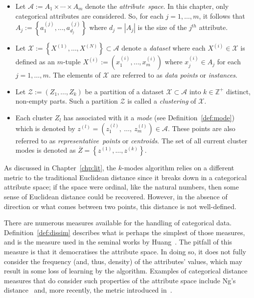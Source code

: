 \begin{itemize}
    \item Let \(\mathcal{A} := A_1 \times \cdots \times A_m\) denote the
        \emph{attribute~space}. In this chapter, only categorical attributes are
        considered. So, for each \(j = 1, \ldots, m\), it follows that
        \(A_j := \left\{a_1^{(j)}, \ldots, a_{d_j}^{(j)}\right\}\) where
        \(d_j=|A_j|\) is the size of the \(j^{th}\) attribute.

    \item Let \(\mathcal{X} := \left\{X^{(1)}, \ldots, X^{(N)}\right\} \subset
        \mathcal{A}\) denote a \emph{dataset} where each \(X^{(i)} \in
        \mathcal{X}\) is defined as an \(m\)-tuple \(X^{(i)} := \left(x_1^{(i)},
        \ldots, x_m^{(i)}\right)\) where \(x_j^{(i)} \in A_j\) for each \(j = 1,
        \ldots, m\). The elements of \(\mathcal{X}\) are referred to as
        \emph{data points} or \emph{instances}.
    \item Let \(\mathcal{Z} := \left(Z_1, \ldots, Z_k\right)\) be a partition
        of a dataset \(\mathcal{X} \subset \mathcal A\) into \(k \in
        \mathbb{Z}^{+}\) distinct, non-empty parts. Such a partition
        \(\mathcal{Z}\) is called a \emph{clustering} of \(\mathcal{X}\).

    \item Each cluster \(Z_l\) has associated with it a
        \emph{mode} (see Definition~\ref{def:mode}) which is
        denoted by \(z^{(l)} = \left(z_1^{(l)},~\ldots,~z_m^{(l)}\right) \in
        \mathcal{A}\). These points are also referred to as
        \emph{representative~points} or \emph{centroids}. The set of all current
        cluster modes is denoted as \(\overline Z = \left\{z^{(1)}, \ldots,
        z^{(k)}\right\}\).
\end{itemize}

As discussed in Chapter~\ref{chp:lit}, the \(k\)-modes algorithm relies on a
different metric to the traditional Euclidean distance since it breaks down in a
categorical attribute space; if the space were ordinal, like the natural
numbers, then some sense of Euclidean distance could be recovered. However, in
the absence of direction or what comes between two points, this distance is not
well-defined.

There are numerous measures available for the handling of categorical data.
Definition~\ref{def:dissim} describes what is perhaps the simplest of those
measures, and is the measure used in the seminal works by
Huang~\cite{Huang1997a,Huang1997b,Huang1998}. The pitfall of this measure is
that it democratises the attribute space. In doing so, it does not fully
consider the frequency (and, thus, density) of the attributes' values, which may
result in some loss of learning by the algorithm. Examples of categorical
distance measures that do consider such properties of the attribute space
include Ng's distance~\cite{Ng2007} and, more recently, the metric introduced
in~\cite{Cao2012}.

